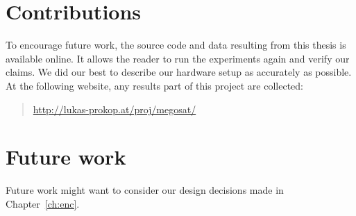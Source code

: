 \section{Contributions}
\label{sec:contributions}
%
To encourage future work, the source code and data resulting from this
thesis is available online.
It allows the reader to run the experiments again and verify our claims.
We did our best to describe our hardware setup as accurately as possible.
At the following website, any results part of this project are collected:

\begin{quote}
  \url{http://lukas-prokop.at/proj/megosat/}
\end{quote}


\section{Future work}
\label{sec:future}
%
Future work might want to consider our design decisions made in
Chapter~\ref{ch:enc}.

